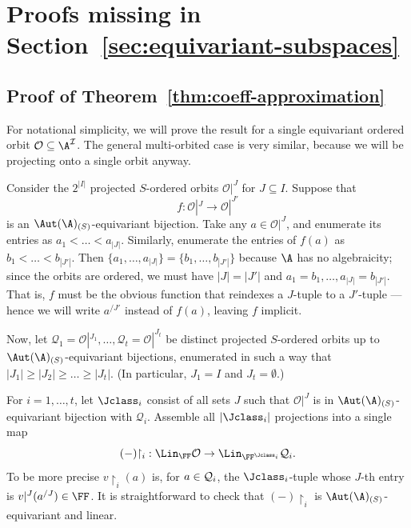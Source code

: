 \section{Proofs missing in Section~\ref{sec:equivariant-subspaces}}\label{sec:appendix-eqsubsp}

\subsection{Proof of Theorem~\ref{thm:coeff-approximation}}
For notational simplicity, we will prove the result for a single equivariant ordered orbit $\cal O \subseteq \A^I$.
The general multi-orbited case is very similar, because we will be projecting onto a single orbit anyway.

Consider the $2^{|I|}$ projected $S$-ordered orbits $\mathcal{O}|^{J}$ for $J \subseteq I$.
Suppose that
\[
    f : \mathcal{O}|^J \to \mathcal{O}|^{J'}
\]
is an $\Aut(\A)_{(S)}$-equivariant bijection.
Take any $a \in \mathcal{O}|^J$,
and enumerate its entries as $a_1 < \dots < a_{|J|}$.
Similarly, enumerate the entries of $f(a)$ as $b_1 < \dots < b_{|J'|}$.
Then $\{a_1, \dots, a_{|J|}\} = \{ b_1, \dots, b_{|J'|} \}$ because $\A$ has no algebraicity; 
since the orbits are ordered, we must have $|J| = |J'|$ and $a_1 = b_1, \dots, a_{|J|} = b_{|J'|}$.
That is, $f$ must be the obvious function that reindexes a $J$-tuple to a $J'$-tuple
--- hence we will write $a^{/J'}$ instead of $f(a)$, leaving $f$ implicit.

Now, let $\mathcal{Q}_{1} = \mathcal{O}|^{J_1}, \dots, \mathcal{Q}_{t} = \mathcal{O}|^{J_t}$ be distinct projected $S$-ordered orbits up to $\Aut(\A)_{(S)}$-equivariant bijections,
enumerated in such a way that $|J_1| \geq |J_2| \geq \dots \geq |J_t|$. (In particular, $J_1=I$ and $J_t=\emptyset$.)

    For $i = 1, \dots, t$, let $\Jclass_i$ consist of all sets $J$ such that $\mathcal{O}|^J$ is in $\Aut(\A)_{(S)}$-equivariant bijection with $\mathcal{Q}_i$.
    Assemble all $|\Jclass_i|$ projections into a single map
    \[
        (-){\restriction_i} : \Lin_\FF\mathcal{O} \to \Lin_{\FF^{\Jclass_i}} \mathcal{Q}_i.
    \]
    To be more precise $v{\restriction_i}(a)$ is, for $a\in{\cal Q}_i$, the $\Jclass_i$-tuple whose $J$-th entry is $v|^J(a^{/J}) \in \FF$.
    It is straightforward to check that $(-){\restriction_i}$ is $\Aut(\A)_{(S)}$-equivariant and linear.



